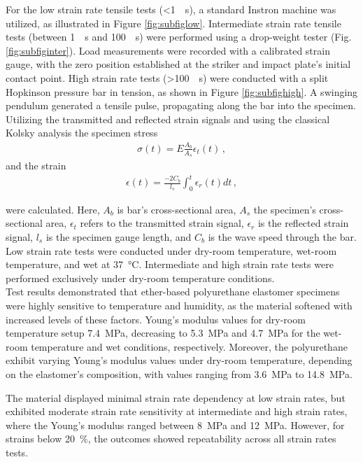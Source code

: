 For the low strain rate tensile tests (\SI[per-mode = symbol]{<1}{\per \second}), a standard Instron machine was utilized, as illustrated in Figure 
\ref{fig:subfiglow}. Intermediate strain rate tensile tests (between \SI[per-mode = symbol]{1}{\per \second} and \SI[per-mode = symbol]{100}{\per \second}) 
were performed using a drop-weight tester (Fig. \ref{fig:subfiginter}). Load measurements were recorded with a calibrated strain gauge, 
with the zero position established at the striker and impact plate's initial contact point.
High strain rate tests (\SI[per-mode = symbol]{>100}{\per \second}) were conducted with a split Hopkinson pressure bar in tension, as shown in Figure \ref{fig:subfighigh}.
A swinging pendulum generated a tensile pulse, propagating along the bar into the specimen. Utilizing 
the transmitted and reflected strain signals and using the classical Kolsky analysis the specimen stress
\begin{align*}
        \sigma(t) = E\frac{A_b}{A_s}\epsilon_t(t) \, ,
\end{align*}
and the strain
\begin{align*}
        \epsilon(t) = \frac{-2C_b}{l_s} \int_{0}^{t} \epsilon_r(t) dt \, ,
\end{align*}

were calculated. Here, $A_b$ is bar's cross-sectional area, $A_s$ the specimen's cross-sectional area,
$\epsilon_t$ refers to the transmitted strain signal, $\epsilon_r$ is the reflected strain signal,
$l_s$ is the specimen gauge length, and $C_b$ is the wave speed through the bar.
Low strain rate tests were conducted under dry-room temperature, wet-room temperature, and wet at \SI{37}{\degreeCelsius}. 
Intermediate and high strain rate tests were performed exclusively under dry-room temperature conditions.\\

Test results demonstrated that ether-based polyurethane elastomer specimens were highly sensitive to 
temperature and humidity, as the material softened with increased levels of these factors. Young's 
modulus values for dry-room temperature setup \SI{7.4}{\mega \pascal}, decreasing to \SI{5.3}{\mega \pascal} 
and \SI{4.7}{\mega \pascal} for the wet-room temperature and wet conditions, respectively.
Moreover, the polyurethane exhibit varying Young's modulus values under dry-room temperature, depending 
on the elastomer's composition, with values ranging from \SI{3.6}{\mega \pascal} to \SI{14.8}{\mega \pascal}.

The material displayed minimal strain rate dependency at low strain rates, but exhibited moderate 
strain rate sensitivity at intermediate and high strain rates, where the Young's modulus ranged between 
\SI{8}{\mega \pascal} and \SI{12}{\mega \pascal}. However, for strains below \SI{20}{\percent}, the 
outcomes showed repeatability across all strain rates tests. 

